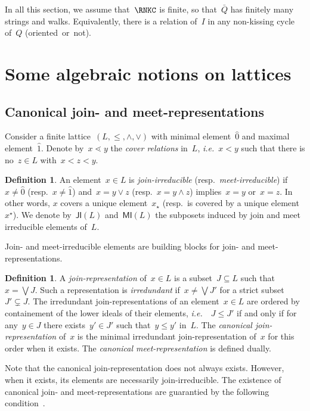 \documentclass{amsart}
\theoremstyle{definition}
\newtheorem{definition}[theorem]{Definition}
\newcommand{\ie}{\textit{i.e.}~} %
\newcommand{\darkblue}{\color{darkblue}} %
\newcommand{\defn}[1]{\textsl{\darkblue #1}} %
\newcommand{\meet}{\wedge} %
\newcommand{\join}{\vee} %
\newcommand{\bigJoin}{\bigvee} %
\newcommand{\JI}{\mathsf{JI}} %
\newcommand{\MI}{\mathsf{MI}} %
\begin{document}
In all this section, we assume that~$\RNKC$ is finite, so that~$\bar Q$ has finitely many strings and walks.
Equivalently, there is a relation of~$I$ in any non-kissing cycle of~$Q$ (oriented~or~not).

\section{Some algebraic notions on lattices}
\label{sec:recollectionLattice}

\subsection{Canonical join- and meet-representations}
\label{subsec:joinIrreducibleRep}

Consider a finite lattice~$(L,\le,\meet,\join)$ with minimal element~$\hat 0$ and maximal element~$\hat 1$.
Denote by~$x \lessdot y$ the \defn{cover relations} in~$L$, \ie $x < y$ such that there is no~$z \in L$ with~$x < z < y$.

\begin{definition}
An element~$x \in L$ is \defn{join-irreducible} (resp.~\defn{meet-irreducible}) if~$x \ne \hat 0$ (resp.~$x \ne \hat 1$) and~$x = y \join z$ (resp.~$x = y \meet z$) implies~$x = y$ or~$x = z$.
In other words, $x$ covers a unique element~$x_\star$ (resp.~is covered by a unique element~$x^\star$).
We denote by~$\JI(L)$ and~$\MI(L)$ the subposets induced by join and meet irreducible elements of~$L$.
\end{definition}

Join- and meet-irreducible elements are building blocks for join- and meet-representations.

\begin{definition}
A \defn{join-representation} of~$x \in L$ is a subset~$J \subseteq L$ such that~$x = \bigJoin J$.
Such a representation is \defn{irredundant} if~$x \ne \bigJoin J'$ for a strict subset~$J' \subsetneq J$.
The irredundant join-representations of an element~$x \in L$ are ordered by containement of the lower ideals of their elements, \ie~$J \le J'$ if and only if for any~$y \in J$ there exists~$y' \in J'$ such that~$y \le y'$ in~$L$.
The \defn{canonical join-representation} of~$x$ is the minimal irredundant join-representation of~$x$ for this order when it exists.
The \defn{canonical meet-representation} is defined dually.
\end{definition}

Note that the canonical join-representation does not always exists.
However, when it exists, its elements are necessarily join-irreducible.
The existence of canonical join- and meet-representations are guarantied by the following condition~\cite[Thm.~2.24]{FreeseNation}.
\end{document}
